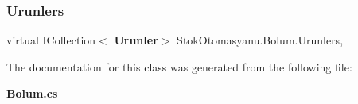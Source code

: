 \mbox{\label{class_stok_otomasyanu_1_1_bolum_ad097a6cb5e560937aa5a525840116877}} 
\subsubsection{Urunlers}
{\footnotesize\ttfamily virtual I\+Collection$<$\textbf{ Urunler}$>$ Stok\+Otomasyanu.\+Bolum.\+Urunlers\hspace{0.3cm}{\ttfamily [get]}, {\ttfamily [set]}}



The documentation for this class was generated from the following file\+:\begin{DoxyCompactItemize}
\item 
\textbf{ Bolum.\+cs}\end{DoxyCompactItemize}
